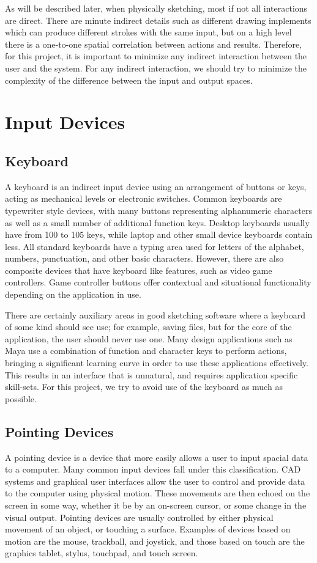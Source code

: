 As will be described later, when physically sketching, most if not all interactions are direct. 
There are minute indirect details such as different drawing implements which can produce different strokes with the same input, but on a high level there is a one-to-one spatial correlation between actions and results.
Therefore, for this project, it is important to minimize any indirect interaction between the user and the system.
For any indirect interaction, we should try to minimize the complexity of the difference between the input and output spaces.

\section{Input Devices}
\subsection{Keyboard}

A keyboard is an indirect input device using an arrangement of buttons or keys, acting as mechanical levels or electronic switches. 
Common keyboards are typewriter style devices, with many buttons representing alphanumeric characters as well as a small number of additional function keys.
Desktop keyboards usually have from 100 to 105 keys, while laptop and other small device keyboards contain less.
All standard keyboards have a typing area used for letters of the alphabet, numbers, punctuation, and other basic characters.
However, there are also composite devices that have keyboard like features, such as video game controllers. 
Game controller buttons offer contextual and situational functionality depending on the application in use.


There are certainly auxiliary areas in good sketching software where a keyboard of some kind should see use; for example, saving files, but for the core of the application, the user should never use one. 
Many design applications such as Maya use a combination of function and character keys to perform actions, bringing a significant learning curve in order to use these applications effectively.
This results in an interface that is unnatural, and requires application specific skill-sets.
For this project, we try to avoid use of the keyboard as much as possible.


\subsection{Pointing Devices}
 A pointing device is a device that more easily allows a user to input spacial data to a computer. 
 Many common input devices fall under this classification. 
 CAD systems and graphical user interfaces allow the user to control and provide data to the computer using physical motion.
 These movements are then echoed on the screen in some way, whether it be by an on-screen cursor, or some change in the visual output.
 Pointing devices are usually controlled by either physical movement of an object, or touching a surface.
 Examples of devices based on motion are the mouse, trackball, and joystick, and those based on touch are the graphics tablet, stylus, touchpad, and touch screen.
 
